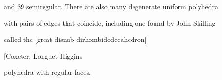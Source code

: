 and 39 semiregular. There are also many degenerate uniform polyhedra

with pairs of edges that coincide, including one found by John Skilling

called the [great disnub dirhombidodecahedron] %

[Coxeter, Longuet-Higgins  %

polyhedra with regular faces.